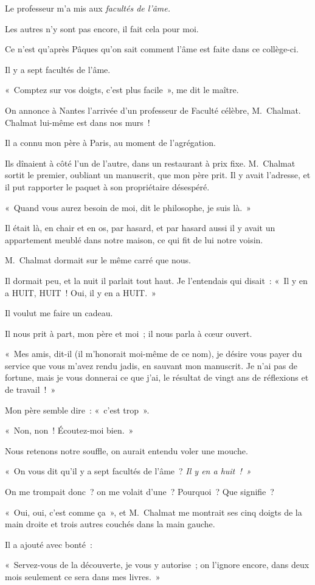 \documentclass[french,twoside]{book} %
\def\mednobreak{\ifdim\lastskip<\medskipamount
  \removelastskip\nopagebreak\medskip\fi}
\newcommand{\labelblock}[1]{\medbreak{\noindent\color{rubric}\bfseries #1}\par\mednobreak}
\begin{document}
\labelblock{MON ÂME}

\noindent Le professeur m’a mis aux\emph{ facultés de l’âme.}\par
Les autres n’y sont pas encore, il fait cela pour moi.\par
Ce n’est qu’après Pâques qu’on sait comment l’âme est faite dans ce collège-ci.\par
Il y a sept facultés de l’âme.\par
« Comptez sur vos doigts, c’est plus facile », me dit le maître.\par
\bigbreak
\noindent On annonce à Nantes l’arrivée d’un professeur de Faculté célèbre, M. Chalmat. Chalmat lui-même est dans nos murs !\par
Il a connu mon père à Paris, au moment de l’agrégation.\par
Ils dînaient à côté l’un de l’autre, dans un restaurant à prix fixe. M. Chalmat sortit le premier, oubliant un manuscrit, que mon père prit. Il y avait l’adresse, et il put rapporter le paquet à son propriétaire désespéré.\par
« Quand vous aurez besoin de moi, dit le philosophe, je suis là. »\par
Il était là, en chair et en os, par hasard, et par hasard aussi il y avait un appartement meublé dans notre maison, ce qui fit de lui notre voisin.\par
M. Chalmat dormait sur le même carré que nous.\par
Il dormait peu, et la nuit il parlait tout haut. Je l’entendais qui disait : « Il y en a HUIT, HUIT ! Oui, il y en a HUIT. »\par
\bigbreak
\noindent Il voulut me faire un cadeau.\par
Il nous prit à part, mon père et moi ; il nous parla à cœur ouvert.\par
« Mes amis, dit-il (il m’honorait moi-même de ce nom), je désire vous payer du service que vous m’avez rendu jadis, en sauvant mon manuscrit. Je n’ai pas de fortune, mais je vous donnerai ce que j’ai, le résultat de vingt ans de réflexions et de travail ! »\par
Mon père semble dire : « c’est trop ».\par
« Non, non ! Écoutez-moi bien. »\par
Nous retenons notre souffle, on aurait entendu voler une mouche.\par
« On vous dit qu’il y a sept facultés de l’âme ? \emph{Il y en a huit ! »}\par
On me trompait donc ? on me volait d’une ? Pourquoi ? Que signifie ?\par
« Oui, oui, c’est comme ça », et M. Chalmat me montrait ses cinq doigts de la main droite et trois autres couchés dans la main gauche.\par
Il a ajouté avec bonté :\par
« Servez-vous de la découverte, je vous y autorise ; on l’ignore encore, dans deux mois seulement ce sera dans mes livres. »\par
\end{document}
